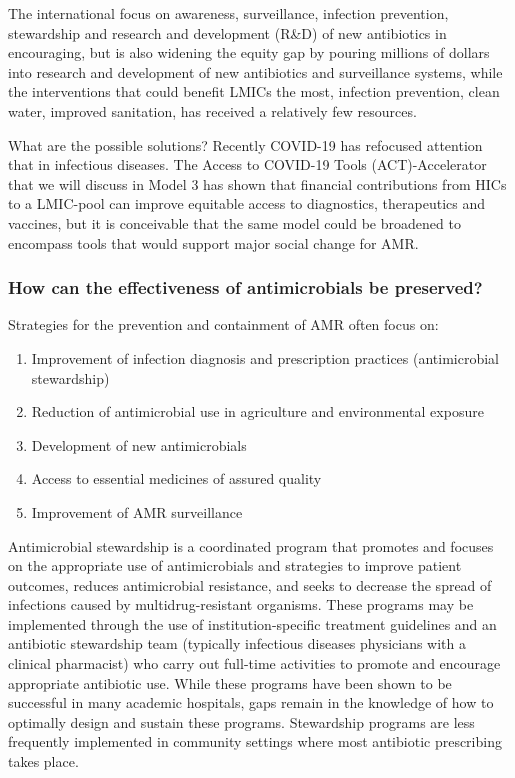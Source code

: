 \documentclass[
  11pt,
  paper=a4,
  ,captions=tableheading
]{scrartcl}
\providecommand{\tightlist}{%
  \setlength{\itemsep}{0pt}\setlength{\parskip}{0pt}}
\begin{document}
The international focus on awareness, surveillance, infection
prevention, stewardship and research and development (R\&D) of new
antibiotics in encouraging, but is also widening the equity gap by
pouring millions of dollars into research and development of new
antibiotics and surveillance systems, while the interventions that could
benefit LMICs the most, infection prevention, clean water, improved
sanitation, has received a relatively few resources.

What are the possible solutions? Recently COVID-19 has refocused
attention that in infectious diseases. The Access to COVID-19 Tools
(ACT)-Accelerator that we will discuss in Model 3 has shown that
financial contributions from HICs to a LMIC-pool can improve equitable
access to diagnostics, therapeutics and vaccines, but it is conceivable
that the same model could be broadened to encompass tools that would
support major social change for AMR.

\hypertarget{how-can-the-effectiveness-of-antimicrobials-be-preserved}{%
\subsubsection*{How can the effectiveness of antimicrobials be
preserved?}\label{how-can-the-effectiveness-of-antimicrobials-be-preserved}}

Strategies for the prevention and containment of AMR often focus on:

\begin{enumerate}
\def\labelenumi{\arabic{enumi}.}
\tightlist
\item
  Improvement of infection diagnosis and prescription practices
  (antimicrobial stewardship)
\item
  Reduction of antimicrobial use in agriculture and environmental
  exposure
\item
  Development of new antimicrobials
\item
  Access to essential medicines of assured quality
\item
  Improvement of AMR surveillance
\end{enumerate}

Antimicrobial stewardship is a coordinated program that promotes and
focuses on the appropriate use of antimicrobials and strategies to
improve patient outcomes, reduces antimicrobial resistance, and seeks to
decrease the spread of infections caused by multidrug-resistant
organisms. These programs may be implemented through the use of
institution-specific treatment guidelines and an antibiotic stewardship
team (typically infectious diseases physicians with a clinical
pharmacist) who carry out full-time activities to promote and encourage
appropriate antibiotic use. While these programs have been shown to be
successful in many academic hospitals, gaps remain in the knowledge of
how to optimally design and sustain these programs. Stewardship programs
are less frequently implemented in community settings where most
antibiotic prescribing takes place.
\end{document}

